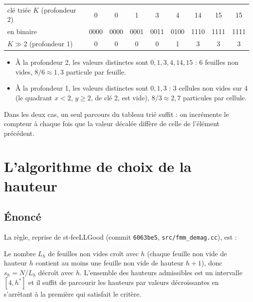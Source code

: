 \documentclass[11pt,a4paper]{article}
\newcommand{\code}[1]{\texttt{#1}}
\begin{document}
\begin{center}
\begin{tabular}{lcccccccc}
\toprule
clé triée $K$ (profondeur 2)       & 0 & 0 & 1 & 3 & 4 & 14 & 15 & 15 \\
en binaire                         & 0000 & 0000 & 0001 & 0011 & 0100 & 1110 & 1111 & 1111 \\
$K \gg 2$ (profondeur 1)           & 0 & 0 & 0 & 0 & 1 & 3 & 3 & 3 \\
\bottomrule
\end{tabular}
\end{center}

\begin{itemize}
  \item À la profondeur 2, les valeurs distinctes sont $0, 1, 3, 4, 14, 15$ : 6 feuilles non
        vides, $8/6 \approx 1{,}3$ particule par feuille.
  \item À la profondeur 1, les valeurs distinctes sont $0, 1, 3$ : 3 cellules non vides sur 4
        (le quadrant $x < 2$, $y \ge 2$, de clé 2, est vide), $8/3 \approx 2{,}7$ particules par
        cellule.
\end{itemize}
Dans les deux cas, un seul parcours du tableau trié suffit : on incrémente le compteur à chaque
fois que la valeur décalée diffère de celle de l'élément précédent.

\section{L'algorithme de choix de la hauteur}

\subsection{Énoncé}

La règle, reprise de st-feeLLGood (commit \code{6063be5}, \code{src/fmm\_demag.cc}), est :

\medskip
\noindent{}
\medskip

Le nombre $L_h$ de feuilles non vides croît avec $h$ (chaque feuille non vide de hauteur $h$
contient au moins une feuille non vide de hauteur $h+1$), donc $s_h = N/L_h$ décroît avec $h$.
L'ensemble des hauteurs admissibles est un intervalle $[4, h^\ast]$ et il suffit de parcourir les
hauteurs par valeurs décroissantes en s'arrêtant à la première qui satisfait le critère.
\end{document}
